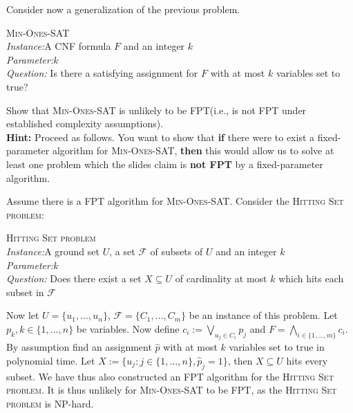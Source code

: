 \documentclass{article}
\begin{document}
\begin{exercise}
    Consider now a generalization of the previous problem.
    \begin{mdframed} \textsc{Min-Ones-SAT} \\
        \textit{Instance:}A CNF formula $F$ and an integer $k$\\
\textit{Parameter:}$k$\\
\textit{Question:} Is there a satisfying assignment for $F$ with at most $k$ variables set to true?
  \end{mdframed}

  Show that \textsc{Min-Ones-SAT} is unlikely to be FPT(i.e., is not FPT under established complexity assumptions).\\
  \textbf{Hint:} Proceed as follows. You want to show that \textbf{if} there were to exist a fixed-parameter algorithm for \textsc{Min-Ones-SAT}, \textbf{then} this would allow us to solve at least one problem which the slides claim is \textbf{not FPT} by a fixed-parameter algorithm.
\end{exercise}
\begin{solving}
    Assume there is a FPT algorithm for \textsc{Min-Ones-SAT}. Consider the \textsc{Hitting Set problem}:
    \begin{mdframed} \textsc{Hitting Set problem} \\
        \textit{Instance:}A ground set $U$, a set $\mathcal F$ of subsets of $U$ and an integer $k$\\
\textit{Parameter:}$k$\\
\textit{Question:} Does there exist a set $X\subseteq U$ of cardinality at most $k$ which hits each subset in $\mathcal F$
  \end{mdframed}
Now let $U= \{u_1,\dots, u_n\}$, $\mathcal F = \{C_1,\dots, C_m\}$ be an instance of this problem. Let $p_k, k\in \{1,\dots, n\}$ be variables. Now define $c_i := \bigvee_{u_j\in C_i}p_j$ and $F= \bigwedge_{i\in \{1,\dots ,m\}} c_i$. By assumption find an assignment $\hat p$ with at most $k$ variables set to true in polynomial time.
Let $X:=\{u_j: j\in \{1,\dots, n\}, \hat p_j = 1 \}$, then $X\subseteq U$ hits every subset. We have thus also constructed an FPT algorithm for the \textsc{Hitting Set problem}. It is thus unlikely for \textsc{Min-Ones-SAT} to be FPT, as the \textsc{Hitting Set problem} is NP-hard.
\end{solving}
\newpage
\end{document}
